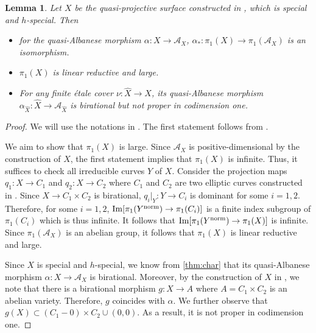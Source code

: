 \documentclass[11pt,english]{smfart}
\theoremstyle{plain}
\newtheorem{lem}[thm]{Lemma}
\theoremstyle{definition}
\theoremstyle{remark}
\numberwithin{equation}{subsection}
\theoremstyle{plain}
\newcommand{\cA}{\mathcal A}
\begin{document}
\begin{lem} \label{lem:20230507}
	Let $X$ be the quasi-projective surface constructed in , which is special and $h$-special.   Then
	\begin{itemize}
	 \item for the quasi-Albanese morphism $\alpha:X\to \cA_X$,   $\alpha_*:\pi_1(X)\to \pi_1(\cA_X)$ is an isomorphism.  
\item $\pi_1(X)$ is linear reductive and  large.
	\item For any finite \'etale cover $\nu:\widehat{X}\to X$, its quasi-Albanese morphism $\alpha_{\widehat{X}}:\widehat{X}\to \cA_{\widehat{X}}$ is birational but not proper in codimension one. 
	\end{itemize} 
\end{lem}
\begin{proof}
	We will use the notations in .  The first statement follows from . 
 
 	We aim to show that $\pi_1(X)$ is large. Since $\cA_X$ is positive-dimensional by the construction of $X$, the first statement implies that $\pi_1(X)$ is infinite. Thus, it suffices to check all irreducible curves $Y$ of $X$. Consider the projection maps $q_1:X\to C_1$ and $q_2:X\to C_2$ where $C_1$ and $C_2$ are two elliptic curves constructed in . Since $X\to C_1\times C_2$ is birational,  $q_i|_{Y}:Y\to C_i$ is dominant for some $i=1,2$. Therefore, for some $i=1,2$, ${\rm Im}[\pi_1(Y^{\rm norm})\to \pi_1(C_i)]$ is a finite index subgroup of $\pi_1(C_i)$ which is thus infinite. It follows that ${\rm Im}[\pi_1(Y^{\rm norm})\to \pi_1(X)]$ is infinite. Since $\pi_1(\cA_X)$ is an abelian group, it follows that $\pi_1(X)$ is linear reductive and large.
 	 
 		
 		 
 Since $X$ is special and $h$-special, we know from \cref{thm:char} that its quasi-Albanese morphism $\alpha:X\to \cA_X$ is birational. Moreover, by the construction of $X$ in , we note that there is a birational morphism $g:X\to A$ where $A=C_1\times C_2$ is an abelian variety. Therefore, $g$ coincides with $\alpha$.      We further observe that $g(X)\subset (C_1-{0})\times C_2\cup {(0,0)}$. As a result, it is not proper in codimension one.
 

\end{proof}
\end{document}
